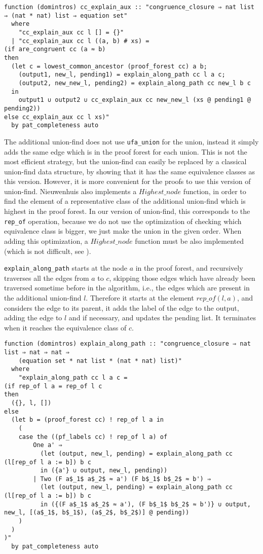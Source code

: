 \begin{lstlisting}
function (domintros) cc_explain_aux :: "congruence_closure ⇒ nat list ⇒ (nat * nat) list ⇒ equation set"
  where
    "cc_explain_aux cc l [] = {}"
  | "cc_explain_aux cc l ((a, b) # xs) =
(if are_congruent cc (a ≈ b)
then
  (let c = lowest_common_ancestor (proof_forest cc) a b;
    (output1, new_l, pending1) = explain_along_path cc l a c;
    (output2, new_new_l, pending2) = explain_along_path cc new_l b c
  in
    output1 ∪ output2 ∪ cc_explain_aux cc new_new_l (xs @ pending1 @ pending2))
else cc_explain_aux cc l xs)"
  by pat_completeness auto
\end{lstlisting}

The additional union-find does not use \lstinline{ufa_union} for the union, instead it simply adds the same edge which is in the proof forest for each union. This is not the most efficient strategy, but the union-find can easily be replaced by a classical union-find data structure, by showing that it has the same equivalence classes as this version. However, it is more convenient for the proofs to use this version of union-find. Nieuwenhuis \cite{Nieuwenhuis} also implements a $Highest\_node$ function, in order to find the element of a representative class of the additional union-find which is highest in the proof forest. In our version of union-find, this corresponds to the \lstinline{rep_of} operation, because we do not use the optimization of checking which equivalence class is bigger, we just make the union in the given order. When adding this optimization, a $Highest\_node$ function must be also implemented (which is not difficult, see \cite{Nieuwenhuis}).

\lstinline{explain_along_path} starts at the node $a$ in the proof forest, and recursively traverses all the edges from $a$ to $c$, skipping those edges which have already been traversed sometime before in the algorithm, i.e., the edges which are present in the additional union-find $l$. Therefore it starts at the element $rep\_of(l, a)$, and considers the edge to its parent, it adds the label of the edge to the output, adding the edge to $l$ and if necessary, and updates the pending list. It terminates when it reaches the equivalence class of $c$.

\begin{lstlisting}
function (domintros) explain_along_path :: "congruence_closure ⇒ nat list ⇒ nat ⇒ nat ⇒
    (equation set * nat list * (nat * nat) list)"
  where
    "explain_along_path cc l a c =
(if rep_of l a = rep_of l c
then
  ({}, l, [])
else
  (let b = (proof_forest cc) ! rep_of l a in
    (
    case the ((pf_labels cc) ! rep_of l a) of
        One a' ⇒
          (let (output, new_l, pending) = explain_along_path cc (l[rep_of l a := b]) b c
          in ({a'} ∪ output, new_l, pending))
        | Two (F a$_1$ a$_2$ ≈ a') (F b$_1$ b$_2$ ≈ b') ⇒
          (let (output, new_l, pending) = explain_along_path cc (l[rep_of l a := b]) b c
          in ({(F a$_1$ a$_2$ ≈ a'), (F b$_1$ b$_2$ ≈ b')} ∪ output, new_l, [(a$_1$, b$_1$), (a$_2$, b$_2$)] @ pending))
    )
  )
)"
  by pat_completeness auto
\end{lstlisting}

